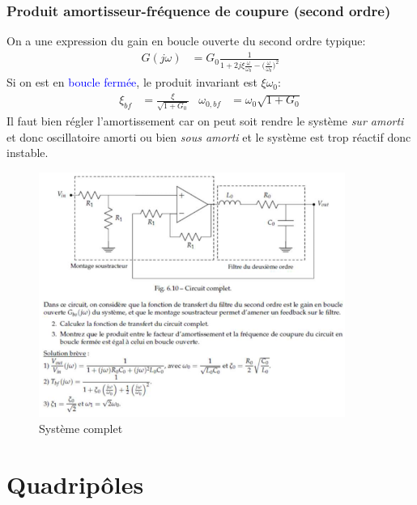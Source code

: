\documentclass{report}
\begin{document}
\subsubsection{Produit amortisseur-fréquence de coupure (second ordre)}
On a une expression du gain en boucle ouverte du second ordre typique:
\begin{align*}
G(j \omega) &= G_0 \frac{1}{1 + 2 j \xi \frac{\omega}{\omega_0} - \Bigr( \frac{\omega}{\omega_0} \Bigr)^2}
\end{align*}
Si on est en \textcolor{blue}{boucle fermée}, le produit invariant est $\xi \omega_0$:
\begin{align*}
\xi_{bf} &= \frac{\xi}{\sqrt{1 + G_0}} & \omega_{0, bf} &= \omega_0 \sqrt{1 + G_0}
\end{align*}
Il faut bien régler l'amortissement car on peut soit rendre le système \textit{sur amorti} et donc oscillatoire amorti ou bien \textit{sous amorti} et le système est trop réactif donc instable. 
\begin{figure}[H]
\centering
\includegraphics[width=10cm]{img/amortissement.png}
\caption{Système complet}
\end{figure}

\section{Quadripôles} \label{Quadri}
\end{document}
